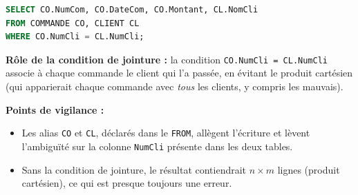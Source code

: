 \documentclass[11pt]{article}
\begin{document}
\begin{corrige}
\begin{lstlisting}[language=SQL]
SELECT CO.NumCom, CO.DateCom, CO.Montant, CL.NomCli
FROM COMMANDE CO, CLIENT CL
WHERE CO.NumCli = CL.NumCli;
\end{lstlisting}

\textbf{Rôle de la condition de jointure :} la condition \texttt{CO.NumCli = CL.NumCli} associe à chaque commande le client qui l'a passée, en évitant le produit cartésien (qui apparierait chaque commande avec \emph{tous} les clients, y compris les mauvais).

\textbf{Points de vigilance :}
\begin{itemize}
    \item Les alias \texttt{CO} et \texttt{CL}, déclarés dans le \texttt{FROM}, allègent l'écriture et lèvent l'ambiguïté sur la colonne \texttt{NumCli} présente dans les deux tables.
    \item Sans la condition de jointure, le résultat contiendrait $n \times m$ lignes (produit cartésien), ce qui est presque toujours une erreur.
\end{itemize}
\end{corrige}
\end{document}
